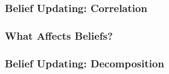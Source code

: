 \documentclass[11pt,hyperref={bookmarks=false}]{beamer}
\begin{document}

\begin{frame}
\frametitle{Belief Updating: Correlation}
\footnotesize


\end{frame}

\begin{frame}
\frametitle{What Affects Beliefs?}
\footnotesize

\end{frame}


\begin{frame}
\frametitle{Belief Updating: Decomposition}
\footnotesize

\end{frame}
\end{document}
